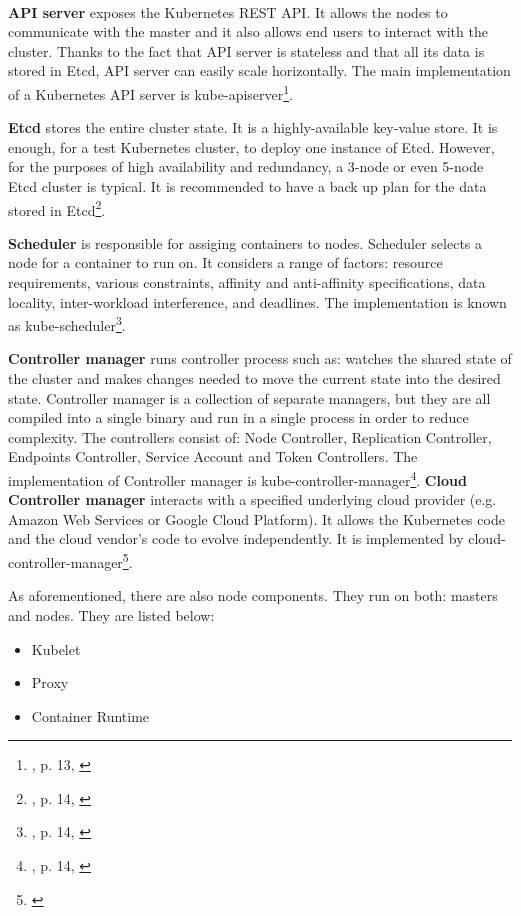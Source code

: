 \documentclass[12pt]{article}
\begin{document}
\paragraph{}
\textbf{API server} exposes the Kubernetes REST API. It allows the nodes to communicate with the master and it also allows end users to interact with the cluster. Thanks to the fact that API server is stateless and that all its data is stored in Etcd, API server can easily scale horizontally. The main implementation of a Kubernetes API server is kube-apiserver\footnote{\cite{book-mastering-k8s}, p. 13, \cite{k8s-cluster,k8s-components}}.

\textbf{Etcd} stores the entire cluster state. It is a highly-available key-value store. It is enough, for a test Kubernetes cluster, to deploy one instance of Etcd. However, for the purposes of high availability and redundancy, a 3-node or even 5-node Etcd cluster is typical. It is recommended to have a back up plan for the data stored in Etcd\footnote{\cite{book-mastering-k8s}, p. 14, \cite{k8s-components}}.

\textbf{Scheduler} is responsible for assiging containers to nodes. Scheduler selects a node for a container to run on. It considers a range of factors: resource requirements, various constraints, affinity and anti-affinity specifications, data locality, inter-workload interference, and deadlines. The implementation is known as kube-scheduler\footnote{\cite{book-mastering-k8s}, p. 14, \cite{k8s-components}}.

\textbf{Controller manager} runs controller process such as: watches the shared state of the cluster and makes changes needed to move the current state into the desired state. Controller manager is a collection of separate managers, but they are all compiled into a single binary and run in a single process in order to reduce complexity. The controllers consist of: Node Controller, Replication Controller, Endpoints Controller, Service Account and Token Controllers. The implementation of Controller manager is kube-controller-manager\footnote{\cite{book-mastering-k8s}, p. 14, \cite{k8s-components}}. \textbf{Cloud Controller manager} interacts with a specified underlying cloud provider (e.g. Amazon Web Services or Google Cloud Platform). It allows the Kubernetes code and the cloud vendor’s code to evolve independently. It is implemented by cloud-controller-manager\footnote{\cite{k8s-components}}.

As aforementioned, there are also node components. They run on both: masters and nodes. They are listed below:
\begin{itemize}
\item Kubelet
\item Proxy
\item Container Runtime
\end{itemize}
\end{document}
